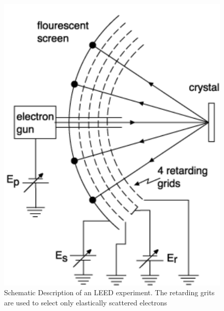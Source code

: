 \documentclass[a4paper]{scrartcl}
\numberwithin{equation}{section}
\numberwithin{figure}{section}
\numberwithin{table}{section}
\begin{document}
\begin{figure}
  \centering
   	\includegraphics[width=\linewidth]{pic/leed.pdf}

 \caption{\small Schematic Description of an LEED experiment. The retarding grits are used to select only elastically scattered electrons}
        \label{fig:leed}
\end{figure}
\end{document}
